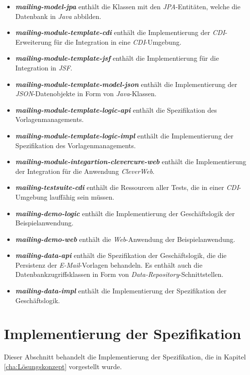 \begin{itemize}
	\item\emph{\textbf{mailing-model-jpa}} enthält die Klassen mit den \emph{JPA}-Entitäten, welche die Datenbank in \emph{Java} abbilden.
	\item\emph{\textbf{mailing-module-template-cdi}} enthält die Implementierung der \emph{CDI}-Erweiterung für die Integration in eine \emph{CDI}-Umgebung.
	\item\emph{\textbf{mailing-module-template-jsf}} enthält die Implementierung für die Integration in \emph{JSF}.
	\item\emph{\textbf{mailing-module-template-model-json}} enthält die Implementierung der \emph{JSON}-Datenobjekte in Form von \emph{Java}-Klassen.	
	\item\emph{\textbf{mailing-module-template-logic-api}} enthält die Spezifikation des Vorlagenmanagements.
	\item\emph{\textbf{mailing-module-template-logic-impl}} enthält die Implementierung der Spezifikation des Vorlagenmanagements.
	\item\emph{\textbf{mailing-module-integartion-clevercure-web}} enthält die Implementierung der Integration für die Anwendung \emph{CleverWeb}.
	\item\emph{\textbf{mailing-testsuite-cdi}} enthält die Ressourcen aller Tests, die in einer \emph{CDI}-Umgebung lauffähig sein müssen.
	\item\emph{\textbf{mailing-demo-logic}} enthält die Implementierung der Geschäftslogik der Beispielanwendung.
	\item\emph{\textbf{mailing-demo-web}} enthält die \emph{Web}-Anwendung der Beispielanwendung.
	\item\emph{\textbf{mailing-data-api}} enthält die Spezifikation der Geschäftslogik, die die Persistenz der \emph{E-Mail}-Vorlagen behandeln. Es enthält auch die Datenbankzugriffsklassen in Form von \emph{Data-Repository}-Schnittstellen.
	\item\emph{\textbf{mailing-data-impl}} enthält die Implementierung der Spezifikation der Geschäftslogik.
\end{itemize} 

\section{Implementierung der Spezifikation}
Dieser Abschnitt behandelt die Implementierung der Spezifikation, die in Kapitel \ref{cha:Lösungskonzept} vorgestellt wurde. 

